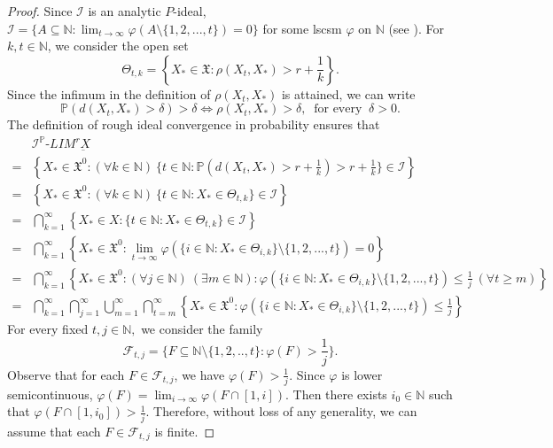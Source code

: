 \documentclass[reqno]{amsart}
\begin{document}
\begin{proof}
	Since $\mathcal{I}$ is an analytic $P$-ideal,  $\mathcal{I}=\{A\subseteq\mathbb{N}:\lim_{t\to\infty}\varphi(A\setminus\{1,2,...,t\})=0\}$ for some lscsm $\varphi$ on $\mathbb{N}$ (see  \cite{solecki}).
	For $k,t\in\mathbb{N}$, we consider the open set $$\Theta_{t,k}=\left\{X_*\in \mathfrak{X}:\rho (X_t,X_*)>r+\frac{1}{k}\right\}.$$
Since the infimum in the definition of $\rho(X_t, X_*)$ is attained, we can write
	$$
	\mathbb{P}(d(X_t,X_*)>\delta)>\delta\Leftrightarrow \rho(X_t,X_*)>\delta, ~\mbox{ for every }~\delta>0.
	$$
The definition of rough ideal convergence in probability ensures that
	\begin{align}\label{eq 1a}
		&\mathcal{I}^{\mathbb{P}}\mbox{-}LIM^r\underbar{X}\nonumber\\
			=& \left\{X_*\in\mathfrak{X^0}: (\forall k\in\mathbb{N})~ \{t\in\mathbb{N}:\mathbb{P}(d(X_t,X_*)>r+\frac{1}{k})>r+\frac{1}{k} \}\in\mathcal{I}\right\}\nonumber\\
		=& \left\{X_*\in\mathfrak{X^0}: (\forall k\in\mathbb{N})~ \{t\in\mathbb{N}:X_*\in \Theta_{t,k} \}\in\mathcal{I}\right\}\nonumber\\
		=&\bigcap_{k=1}^{\infty}\left\{X_*\in X:  \{t\in\mathbb{N}:X_*\in \Theta_{t,k} \}\in\mathcal{I}\right\}\nonumber\\
		=&\bigcap_{k=1}^{\infty}\left\{X_*\in\mathfrak{X^0}: \lim_{t\to\infty} \varphi(\{i\in\mathbb{N}:X_*\in \Theta_{i,k} \}\setminus\{1,2,...,t\})=0 \right\}\nonumber\\
		=&\bigcap_{k=1}^{\infty}\left\{X_*\in\mathfrak{X^0}: (\forall j\in\mathbb{N})~(\exists m\in\mathbb{N}): \varphi(\{i\in\mathbb{N}:X_*\in \Theta_{i,k} \}\setminus\{1,2,...,t\})\leq\frac{1}{j}~(\forall t\geq m) \right\}\nonumber\\
		=&\bigcap_{k=1}^{\infty}\bigcap_{j=1}^{\infty}\bigcup_{m=1}^{\infty}\bigcap_{t=m}^{\infty} \left\{X_*\in\mathfrak{X^0}:  \varphi(\{i\in\mathbb{N}:X_*\in \Theta_{i,k} \}\setminus\{1,2,...,t\})\leq\frac{1}{j}\right\}
	\end{align}
	For every fixed $t,j\in\mathbb{N},$ we consider the family  $$\mathscr{F}_{t,j}=\{F\subseteq \mathbb{N}\setminus\{1,2,..,t\}: \varphi{(F)}>\frac{1}{j}\}.$$
	Observe that for each \( F \in \mathscr{F}_{t,j} \), we have \( \varphi(F) > \frac{1}{j} \). Since \( \varphi \) is lower semicontinuous, \( \varphi(F) = \displaystyle\lim_{i \to \infty} \varphi(F \cap [1,i]) \). Then there exists \( i_0 \in \mathbb{N} \) such that \( \varphi(F \cap [1,i_0]) > \frac{1}{j} \). Therefore, without loss of any generality, we can assume that each \( F \in \mathscr{F}_{t,j} \) is finite.

\end{proof}
\end{document}
